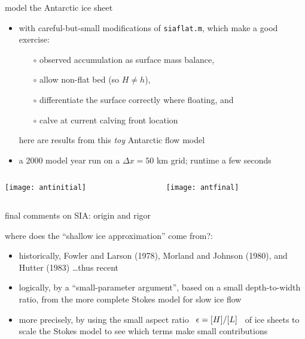 \begin{frame}{model the Antarctic ice sheet}

\normalsize
\begin{itemize}
\item with careful-but-small modifications of \texttt{siaflat.m}, which make a good exercise:
  \begin{itemize}
  \item[$\circ$] observed accumulation as surface mass balance,
  \item[$\circ$] allow non-flat bed (so $H\ne h$),
  \item[$\circ$] differentiate the surface correctly where floating, and
  \item[$\circ$] calve at current calving front location
  \end{itemize}
here are results from this \emph{toy} Antarctic flow model
\item a 2000 model year run on a $\Delta x=50$ km grid; runtime a few seconds
\end{itemize}

\bigskip

\begin{columns}
\begin{column}{0.4\textwidth}
\texttt{[image: antinitial]}
\end{column}
\begin{column}{0.55\textwidth}
\texttt{[image: antfinal]}
\end{column}
\end{columns}
\end{frame}


\begin{frame}{final comments on SIA: origin and rigor}

where does the ``shallow ice approximation'' come from?:
\bigskip

\begin{itemize}
\item historically, Fowler and Larson (1978), Morland and Johnson (1980), and Hutter (1983) \dots thus recent
\item logically, by a ``small-parameter argument'', based on a small depth-to-width ratio, from the more complete Stokes model for slow ice flow
\item more precisely, by using the small aspect ratio \, $\epsilon = [H]/[L]$ \, of ice sheets to scale the Stokes model to see which terms make small contributions
\end{itemize}
\end{frame}